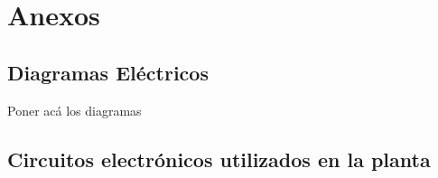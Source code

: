 \chapter{Anexos}


\cleardoublepage
\section{Diagramas Eléctricos}
\label{anexo:diag}
Poner acá los diagramas

\section{Circuitos electrónicos utilizados en la planta}
\label{anexo:circuitos}



